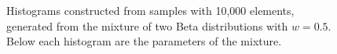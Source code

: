 \documentclass[10pt]{article}
\begin{document}
\begin{figure}[h]
{  }
  \caption{Histograms constructed from samples with 10,000 elements, generated 
from the mixture of two Beta distributions with $w=0.5$. Below each histogram 
are the parameters of the mixture.}
  \label{fig:10111213}
\end{figure}
\end{document}
